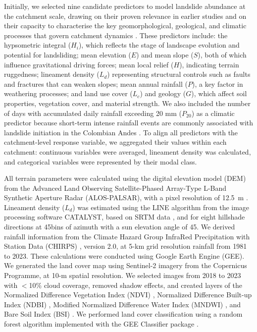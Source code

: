 \documentclass[lineno,pdflatex,sn-basic]{sn-jnl}%
\theoremstyle{thmstyleone}%
\theoremstyle{thmstyletwo}%
\theoremstyle{thmstylethree}%
\begin{document}
Initially, we selected nine candidate predictors to model landslide abundance at the catchment scale, drawing on their proven relevance in earlier studies and on their capacity to characterise the key geomorphological, geological, and climatic processes that govern catchment dynamics \citep{reichenbach2018, van2008spatial}. 
These predictors include: the hypsometric integral ($H_i$), which reflects the stage of landscape evolution and potential for landsliding; mean elevation ($E$) and mean slope ($S$), both of which influence gravitational driving forces; mean local relief ($H$), indicating terrain ruggedness; lineament density ($L_d$) representing structural controls such as faults and fractures that can weaken slopes; mean annual rainfall ($P$), a key factor in weathering processes; and land use cover ($L_c$) and geology ($G$), which affect soil properties, vegetation cover, and material strength. 
We also included the number of days with accumulated daily rainfall exceeding 20 mm ($P_\text{20}$) as a climatic predictor because short-term intense rainfall events are commonly associated with landslide initiation in the Colombian Andes \citep{aristizabal2020spatial}. 
To align all predictors with the catchment-level response variable, we aggregated their values within each catchment: continuous variables were averaged, lineament density was calculated, and categorical variables were represented by their modal class. 

All terrain parameters were calculated using the digital elevation model (DEM) from the Advanced Land Observing Satellite-Phased Array-Type L-Band Synthetic Aperture Radar (ALOS-PALSAR), with a pixel resolution of 12.5~m \citep{logan2014}. 
Lineament density ($L_d$) was estimated using the LINE algorithm from the image processing software CATALYST, based on SRTM data \citep{villalta2002}, and for eight hillshade directions at 45\degree bins of azimuth with a sun elevation angle of 45\degree. 
We derived rainfall information from the Climate Hazard Group InfraRed Precipitation with Station Data (CHIRPS) \citep{funk2015}, version 2.0, at 5-km grid resolution rainfall from 1981 to 2023. 
These calculations were conducted using Google Earth Engine (GEE). 
We generated the land cover map using Sentinel-2 imagery from the Copernicus Programme, at 10-m spatial resolution. 
We selected images from 2018 to 2023 with $<$10\% cloud coverage, removed shadow effects, and created layers of the Normalized Difference Vegetation Index (NDVI) \citep{kriegler1969}, Normalized Difference Built-up Index (NDBI) \citep{zha2003}, Modified Normalized Difference Water Index (MNDWI) \citep{xu2006}, and Bare Soil Index (BSI) \citep{li2014}. 
We performed land cover classification using a random forest algorithm implemented with the GEE Classifier package \citep{breiman2001}.
\end{document}

